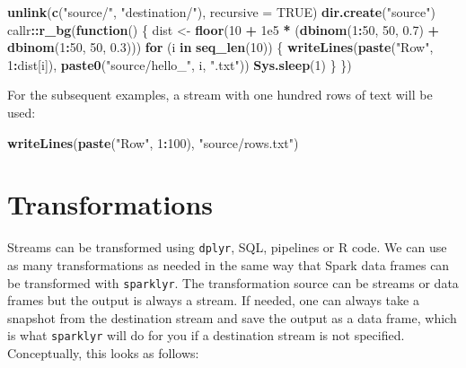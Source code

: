 \documentclass[]{book}
\newenvironment{Shaded}{\begin{snugshade}}{\end{snugshade}}
\newcommand{\ControlFlowTok}[1]{\textcolor[rgb]{0.13,0.29,0.53}{\textbf{#1}}}
\newcommand{\DataTypeTok}[1]{\textcolor[rgb]{0.13,0.29,0.53}{#1}}
\newcommand{\DecValTok}[1]{\textcolor[rgb]{0.00,0.00,0.81}{#1}}
\newcommand{\FloatTok}[1]{\textcolor[rgb]{0.00,0.00,0.81}{#1}}
\newcommand{\KeywordTok}[1]{\textcolor[rgb]{0.13,0.29,0.53}{\textbf{#1}}}
\newcommand{\NormalTok}[1]{#1}
\newcommand{\OperatorTok}[1]{\textcolor[rgb]{0.81,0.36,0.00}{\textbf{#1}}}
\newcommand{\OtherTok}[1]{\textcolor[rgb]{0.56,0.35,0.01}{#1}}
\newcommand{\StringTok}[1]{\textcolor[rgb]{0.31,0.60,0.02}{#1}}
\theoremstyle{definition}
\theoremstyle{definition}
\theoremstyle{definition}
\theoremstyle{remark}
\begin{document}
\begin{Shaded}
\begin{Highlighting}[]
\KeywordTok{unlink}\NormalTok{(}\KeywordTok{c}\NormalTok{(}\StringTok{"source/"}\NormalTok{, }\StringTok{"destination/"}\NormalTok{), }\DataTypeTok{recursive =} \OtherTok{TRUE}\NormalTok{)}
\KeywordTok{dir.create}\NormalTok{(}\StringTok{"source"}\NormalTok{)}
\NormalTok{callr}\OperatorTok{::}\KeywordTok{r_bg}\NormalTok{(}\ControlFlowTok{function}\NormalTok{() \{}
\NormalTok{  dist <-}\StringTok{ }\KeywordTok{floor}\NormalTok{(}\DecValTok{10} \OperatorTok{+}\StringTok{ }\FloatTok{1e5} \OperatorTok{*}\StringTok{ }\NormalTok{(}\KeywordTok{dbinom}\NormalTok{(}\DecValTok{1}\OperatorTok{:}\DecValTok{50}\NormalTok{, }\DecValTok{50}\NormalTok{, }\FloatTok{0.7}\NormalTok{) }\OperatorTok{+}\StringTok{ }\KeywordTok{dbinom}\NormalTok{(}\DecValTok{1}\OperatorTok{:}\DecValTok{50}\NormalTok{, }\DecValTok{50}\NormalTok{, }\FloatTok{0.3}\NormalTok{)))}
  \ControlFlowTok{for}\NormalTok{ (i }\ControlFlowTok{in} \KeywordTok{seq_len}\NormalTok{(}\DecValTok{10}\NormalTok{)) \{}
    \KeywordTok{writeLines}\NormalTok{(}\KeywordTok{paste}\NormalTok{(}\StringTok{"Row"}\NormalTok{, }\DecValTok{1}\OperatorTok{:}\NormalTok{dist[i]), }\KeywordTok{paste0}\NormalTok{(}\StringTok{"source/hello_"}\NormalTok{, i, }\StringTok{".txt"}\NormalTok{))}
    \KeywordTok{Sys.sleep}\NormalTok{(}\DecValTok{1}\NormalTok{)}
\NormalTok{  \}}
\NormalTok{\})}
\end{Highlighting}
\end{Shaded}

For the subsequent examples, a stream with one hundred rows of text will
be used:

\begin{Shaded}
\begin{Highlighting}[]
\KeywordTok{writeLines}\NormalTok{(}\KeywordTok{paste}\NormalTok{(}\StringTok{"Row"}\NormalTok{, }\DecValTok{1}\OperatorTok{:}\DecValTok{100}\NormalTok{), }\StringTok{"source/rows.txt"}\NormalTok{)}
\end{Highlighting}
\end{Shaded}

\hypertarget{transformations}{%
\section{Transformations}\label{transformations}}

Streams can be transformed using \texttt{dplyr}, SQL, pipelines or R
code. We can use as many transformations as needed in the same way that
Spark data frames can be transformed with \texttt{sparklyr}. The
transformation source can be streams or data frames but the output is
always a stream. If needed, one can always take a snapshot from the
destination stream and save the output as a data frame, which is what
\texttt{sparklyr} will do for you if a destination stream is not
specified. Conceptually, this looks as follows:
\end{document}
